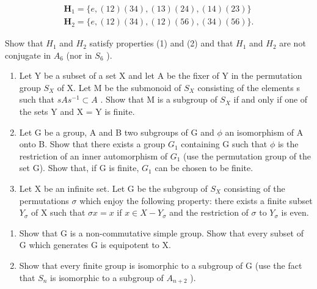 \[
\begin{array}{l} \mathbf {H} _ {1} = \{e, (1 2) (3 4), (1 3) (2 4), (1 4) (2 3) \} \\ \mathbf {H} _ {2} = \{e, (1 2) (3 4), (1 2) (5 6), (3 4) (5 6) \}. \end{array}
\]

Show that \(H_{1}\) and \(H_{2}\) satisfy properties (1) and (2) and that \(H_{1}\) and \(H_{2}\) are not conjugate in \(A_{6}\) (nor in \(S_{6}\) ).

\begin{enumerate}
\def\labelenumi{\arabic{enumi}.}
\setcounter{enumi}{26}
\item
  Let Y be a subset of a set X and let A be the fixer of Y in the permutation group \(S_{X}\) of X. Let M be the submonoid of \(S_{X}\) consisting of the elements s such that \(sAs^{-1} \subset A\) . Show that M is a subgroup of \(S_{X}\) if and only if one of the sets Y and X = Y is finite.
\item
  Let G be a group, A and B two subgroups of G and \(\phi\) an isomorphism of A onto B. Show that there exists a group \(G_{1}\) containing G such that \(\phi\) is the restriction of an inner automorphism of \(G_{1}\) (use the permutation group of the set G). Show that, if G is finite, \(G_{1}\) can be chosen to be finite.
\item
  Let X be an infinite set. Let G be the subgroup of \(S_{X}\) consisting of the permutations \(\sigma\) which enjoy the following property: there exists a finite subset \(Y_{\sigma}\) of X such that \(\sigma x = x\) if \(x \in X - Y_{\sigma}\) and the restriction of \(\sigma\) to \(Y_{\sigma}\) is even.
\end{enumerate}

\begin{enumerate}
\def\labelenumi{(\alph{enumi})}
\item
  Show that G is a non-commutative simple group. Show that every subset of G which generates G is equipotent to X.
\item
  Show that every finite group is isomorphic to a subgroup of G (use the fact that \(S_{n}\) is isomorphic to a subgroup of \(A_{n+2}\) ).
\end{enumerate}

